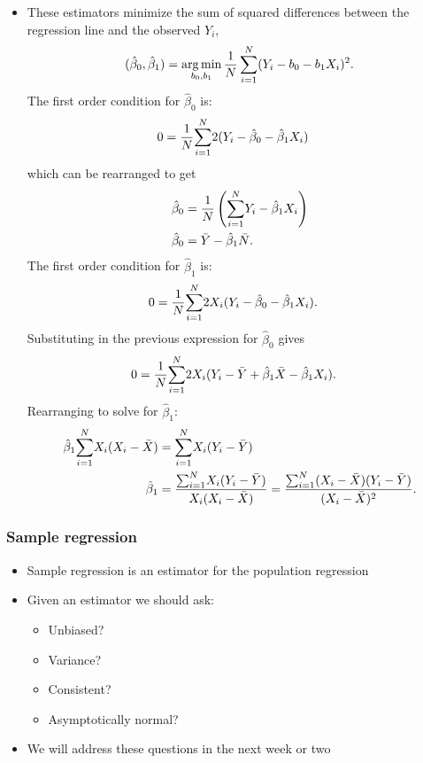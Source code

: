 \begin{frame}[allowframebreaks]
\begin{itemize}
\item These estimators minimize the sum of squared
differences between the regression line and the observed $Y_i$, 
\[ (\hat{\beta}_0, \hat{\beta}_1) = \argmin_{b_0,b_1}
\frac{1}{N}\sum_{i=1}^N (Y_i - b_0 - b_1 X_i)^2. \] 
The first order condition for $\hat{\beta}_0$ is:
\begin{align*}
  0 &=  \frac{1}{N} {\sum_{i=1}^N} 2(Y_i - \hat{\beta}_0 - \hat{\beta}_1 X_i ) 
\end{align*}
which can be rearranged to get
\begin{align*}
  \hat{\beta}_0 &=  \frac{1}{N} \left({\sum_{i=1}^N} Y_i - \hat{\beta}_1 X_i
  \right) \\
  \hat{\beta}_0 &=  \bar{Y} - \hat{\beta}_1 \bar{N}.
\end{align*}
The first order condition for $\hat{\beta}_1$ is: 
\begin{align*}
  0 &=  \frac{1}{N} {\sum_{i=1}^N} 2X_i (Y_i - \hat{\beta}_0 - \hat{\beta}_1 X_i ).
\end{align*}
Substituting in the previous expression for $\hat{\beta}_0$ gives
\begin{align*}
  0 &=  \frac{1}{N} {\sum_{i=1}^N} 2 X_i (Y_i - \bar{Y} + \hat{\beta}_1 \bar{X} - \hat{\beta}_1 X_i ). 
\end{align*}
Rearranging to solve for $\hat{\beta}_1$:
\begin{align*}
  \hat{\beta}_1 {\sum_{i=1}^N} X_i(X_i - \bar{X}) &=  {\sum_{i=1}^N} X_i (Y_i -
  \bar{Y}) \\
  \hat{\beta}_1 &=  \frac{{\sum_{i=1}^N} X_i (Y_i - \bar{Y})}{ X_i (X_i -
    \bar{X}) } = \frac{{\sum_{i=1}^N} (X_i - \bar{X}) (Y_i - \bar{Y})}{ (X_i -
    \bar{X})^2 }.
\end{align*}
 \end{itemize}
\end{frame}

\begin{frame}[allowframebreaks]
  \frametitle{Sample regression}
  \begin{itemize}
  \item Sample regression is an estimator for the population
    regression
  \item Given an estimator we should ask:
    \begin{itemize}
    \item Unbiased?
    \item Variance?
    \item Consistent?
    \item Asymptotically normal?
    \end{itemize}
  \item We will address these questions in the next week or two  
  \end{itemize}
\end{frame}

